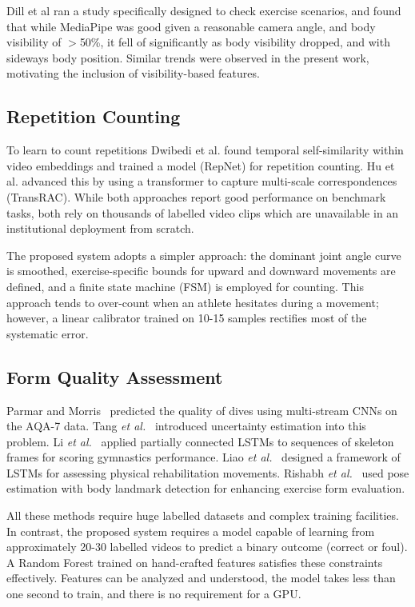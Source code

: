 \documentclass[conference]{IEEEtran}
\begin{document}
Dill et al \cite{dill2023} ran a study specifically designed to check exercise scenarios, and found that while MediaPipe was good given a reasonable camera angle, and body visibility of $>$50\%, it fell of significantly as body visibility dropped, and with sideways body position. Similar trends were observed in the present work, motivating the inclusion of visibility-based features.

\subsection{Repetition Counting}
To learn to count repetitions Dwibedi et al. \cite{dwibedi2020} found temporal self-similarity within video embeddings and trained a model (RepNet) for repetition counting. Hu et al. \cite{hu2022} advanced this by using a transformer to capture multi-scale correspondences (TransRAC). While both approaches report good performance on benchmark tasks, both rely on thousands of labelled video clips which are unavailable in an institutional deployment from scratch.

The proposed system adopts a simpler approach: the dominant joint angle curve is smoothed, exercise-specific bounds for upward and downward movements are defined, and a finite state machine (FSM) is employed for counting. This approach tends to over-count when an athlete hesitates during a movement; however, a linear calibrator trained on 10-15 samples rectifies most of the systematic error.

\subsection{Form Quality Assessment}
Parmar and Morris~\cite{parmar2019} predicted the quality of dives using multi-stream CNNs on the AQA-7 data. Tang \textit{et al.}~\cite{tang2020} introduced uncertainty estimation into this problem. Li \textit{et al.}~\cite{li2023} applied partially connected LSTMs to sequences of skeleton frames for scoring gymnastics performance. Liao \textit{et al.}~\cite{liao2020} designed a framework of LSTMs for assessing physical rehabilitation movements. Rishabh \textit{et al.}~\cite{rishabh2024} used pose estimation with body landmark detection for enhancing exercise form evaluation.

All these methods require huge labelled datasets and complex training facilities. In contrast, the proposed system requires a model capable of learning from approximately 20-30 labelled videos to predict a binary outcome (correct or foul). A Random Forest trained on hand-crafted features satisfies these constraints effectively. Features can be analyzed and understood, the model takes less than one second to train, and there is no requirement for a GPU.
\end{document}
